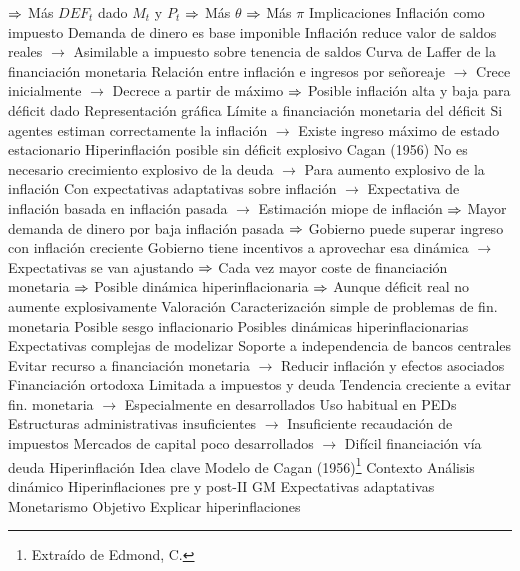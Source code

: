 \documentclass{nuevotema}
\begin{document}
\begin{esquemal}
				\4[] $\Rightarrow$ Más $DEF_t$ dado $M_t$ y $P_t$ $\Rightarrow$ Más $\theta$ $\Rightarrow$ Más $\pi$
			\3 Implicaciones
				\4 Inflación como impuesto
				\4[] Demanda de dinero es base imponible
				\4[] Inflación reduce valor de saldos reales
				\4[] $\to$ Asimilable a impuesto sobre tenencia de saldos
				\4 Curva de Laffer de la financiación monetaria
				\4[] Relación entre inflación e ingresos por señoreaje
				\4[] $\to$ Crece inicialmente
				\4[] $\to$ Decrece a partir de máximo
				\4[] $\Rightarrow$ Posible inflación alta y baja para déficit dado
				\4[] Representación gráfica
				\4[] 
				\4 Límite a financiación monetaria del déficit
				\4[] Si agentes estiman correctamente la inflación
				\4[] $\to$ Existe ingreso máximo de estado estacionario
				\4 Hiperinflación posible sin déficit explosivo
				\4[] Cagan (1956)
				\4[] No es necesario crecimiento explosivo de la deuda
				\4[] $\to$ Para aumento explosivo de la inflación
				\4[] Con expectativas adaptativas sobre inflación
				\4[] $\to$ Expectativa de inflación basada en inflación pasada
				\4[] $\to$ Estimación miope de inflación
				\4[] $\Rightarrow$ Mayor demanda de dinero por baja inflación pasada
				\4[] $\Rightarrow$ Gobierno puede superar ingreso con inflación creciente
				\4[] Gobierno tiene incentivos a aprovechar esa dinámica
				\4[] $\to$ Expectativas se van ajustando
				\4[] $\Rightarrow$ Cada vez mayor coste de financiación monetaria
				\4[] $\Rightarrow$ Posible dinámica hiperinflacionaria
				\4[] $\Rightarrow$ Aunque déficit real no aumente explosivamente
			\3 Valoración
				\4 Caracterización simple de problemas de fin. monetaria
				\4[] Posible sesgo inflacionario
				\4[] Posibles dinámicas hiperinflacionarias
				\4[] Expectativas complejas de modelizar
				\4 Soporte a independencia de bancos centrales
				\4[] Evitar recurso a financiación monetaria
				\4[] $\to$ Reducir inflación y efectos asociados
				\4 Financiación ortodoxa
				\4[] Limitada a impuestos y deuda
				\4[] Tendencia creciente a evitar fin. monetaria
				\4[] $\to$ Especialmente en desarrollados
				\4 Uso habitual en PEDs
				\4[] Estructuras administrativas insuficientes
				\4[] $\to$ Insuficiente recaudación de impuestos
				\4[] Mercados de capital poco desarrollados
				\4[] $\to$ Difícil financiación vía deuda
		\2 Hiperinflación
			\3 Idea clave
				\4[] Modelo de Cagan (1956)\footnote{Extraído de Edmond, C.}
				\4 Contexto
				\4[] Análisis dinámico
				\4[] Hiperinflaciones pre y post-II GM
				\4[] Expectativas adaptativas
				\4[] Monetarismo
				\4 Objetivo
				\4[] Explicar hiperinflaciones

\end{esquemal}
\end{document}
